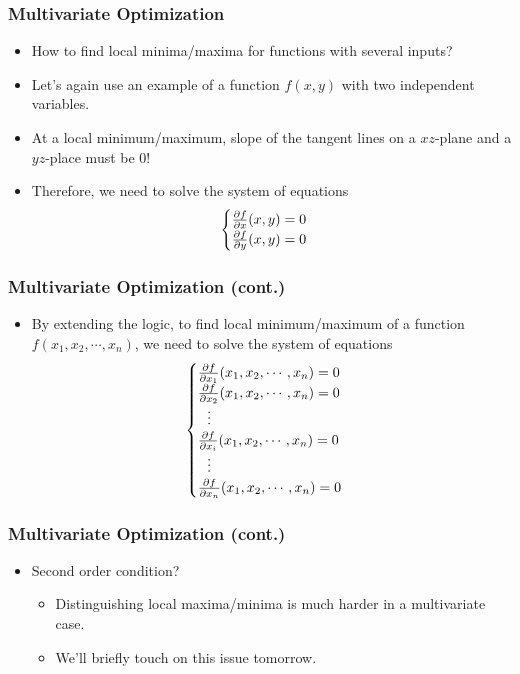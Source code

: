 \documentclass[pdflatex, 12pt]{beamer}
\begin{document}
\begin{frame}
\frametitle{Multivariate Optimization}
\begin{itemize}
\item How to find local minima/maxima for functions with several inputs?
\vspace{0.4cm}
\item Let's again use an example of a function $f(x, y)$ with two independent variables.
\vspace{0.4cm}
\item At a local minimum/maximum, slope of the tangent lines on a $xz$-plane and a $yz$-place must be 0! 
\vspace{0.4cm}
\item Therefore, we need to solve the system of equations
 \begin{eqnarray}
 \begin{cases}
 \frac{\partial f}{\partial x} (x, y) = 0 \\
 \frac{\partial f}{\partial y} (x, y) = 0 \notag
 \end{cases}
 \end{eqnarray} 
\end{itemize}
\end{frame}

\begin{frame}
\frametitle{Multivariate Optimization (cont.)}
\begin{itemize}
\item By extending the logic, to find local minimum/maximum of a function $f(x_1, x_2, \cdots, x_n)$, we need to solve the system of equations
 {\normalsize
 \begin{eqnarray}
 \begin{cases}
 \frac{\partial f}{\partial x_1} (x_1, x_2, \cdots, x_n) = 0 \\
 \frac{\partial f}{\partial x_2} (x_1, x_2, \cdots, x_n) = 0 \\
 \ \ \vdots \\
 \frac{\partial f}{\partial x_i} (x_1, x_2, \cdots, x_n) = 0 \\
 \ \ \vdots \\
 \frac{\partial f}{\partial x_n} (x_1, x_2, \cdots, x_n) = 0 \notag
 \end{cases}
 \end{eqnarray}
 }
\end{itemize}
\end{frame}

\begin{frame}
\frametitle{Multivariate Optimization (cont.)}
\begin{itemize}
\item Second order condition?
 \begin{itemize}
 \item Distinguishing local maxima/minima is much harder in a multivariate case.
 \item We'll briefly touch on this issue tomorrow.
 \end{itemize}
\end{itemize}
\end{frame}
\end{document}
